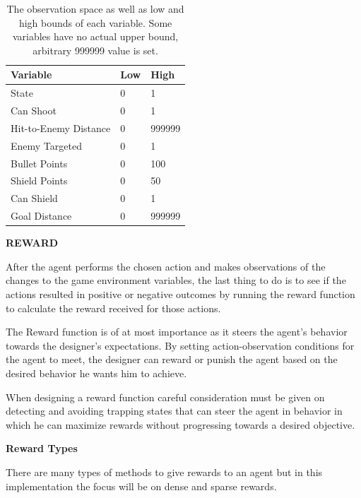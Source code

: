 \documentclass[a4paper,one side,12pt]{book}
\begin{document}
\begin{table}[H]
    \centering  
    \begin{tabular}
    {|m{4em}||m{3em}||m{3em}|}
    \hline
         Variable & Low & High\\
    \hline    
    \hline
         State & 0 & 1\\
         \hline
         Can Shoot& 0 & 1\\
         \hline
         Hit-to-Enemy Distance& 0 & 999999\\
         \hline
         Enemy \newline Targeted& 0 & 1\\
         \hline
         Bullet Points& 0 & 100\\
         \hline
         Shield Points& 0 & 50\\
         \hline
         Can Shield& 0 & 1\\
         \hline
        Goal \newline Distance & 0 & 999999\\
         \hline
    \end{tabular}
    \caption{The observation space as well as low and high
bounds of each variable. Some variables have no actual upper bound, arbitrary 999999 value is set.}
\end{table} 

\textbf{REWARD}

After the agent performs the chosen action and makes observations of the
changes to the game environment variables, the last thing to do is to
see if the actions resulted in positive or negative outcomes by running
the reward function to calculate the reward received for those actions.

The Reward function is of at most importance as it steers the agent's
behavior towards the designer's expectations. By setting
action-observation conditions for the agent to meet, the designer can
reward or punish the agent based on the desired behavior he wants him
to achieve.

When designing a reward function careful consideration must be given on
detecting and avoiding trapping states that can steer the agent in
behavior in which he can maximize rewards without progressing towards a
desired objective.

\textbf{Reward Types}

There are many types of methods to give rewards to an agent but in this
implementation the focus will be on dense and sparse rewards.
\end{document}
